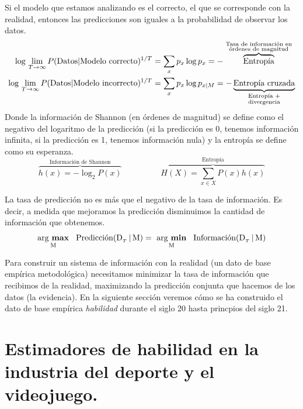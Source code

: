 \documentclass[a4paper,11pt]{book}
\newcommand\hfrac[2]{\genfrac{}{}{0pt}{}{#1}{#2}} %
\theoremstyle{definition}
\begin{document}
Si el modelo que estamos analizando es el correcto, el que se corresponde con la realidad, entonces las predicciones son iguales a la probabilidad de observar los datos.
%
\begin{align*}
\log \, \lim_{T \rightarrow \infty} P(\text{Datos}|\text{Modelo correcto})^{1/T} &= \sum_x p_x \log p_x = - \overbrace{\text{Entropía}}^{\hfrac{\text{\scriptsize Tasa de información en}}{\text{\scriptsize órdenes de magnitud}}} \\
\log \, \lim_{T \rightarrow \infty} P(\text{Datos}|\text{Modelo incorrecto})^{1/T} &= \sum_x p_x \log p_{x|M} = - \underbrace{\text{Entropía cruzada}}_{\hfrac{\text{\scriptsize Entropía +}}{\text{\scriptsize divergencia}}}
\end{align*}
%
Donde la información de Shannon (en órdenes de magnitud) se define como el negativo del logaritmo de la predicción (si la predicción es 0, tenemos información infinita, si la predicción es 1, tenemos información nula) y la entropía se define como su esperanza.
%
\begin{equation*}
\overbrace{h(x) = - \log_2 P(x)}^{\text{Información de Shannon}}  \hspace{2cm} \overbrace{H(X) = \sum_{x\in X} P(x) h(x)}^{\text{Entropía}}
\end{equation*}


La tasa de predicción no es más que el negativo de la tasa de información.
%
Es decir, a medida que mejoramos la predicción disminuimos la cantidad de información que obtenemos.
%
\begin{equation*}
\underset{\text{M}}{\text{arg \textbf{max}}}
\hspace{0.3cm}  \text{Predicción}(\text{D}_{_T} \, | \, \text{M}) = \ \underset{\text{M}}{\text{arg \textbf{min}}} \hspace{0.3cm} \text{Información} (\text{D}_{_T}\,|\,\text{M})
\end{equation*}


Para construir un sistema de información con la realidad (un dato de base empírica metodológica) necesitamos minimizar la tasa de información que recibimos de la realidad, maximizando la predicción conjunta que hacemos de los datos (la evidencia).
%
En la siguiente sección veremos cómo se ha construido el dato de base empírica \emph{habilidad} durante el siglo 20 hasta princpios del siglo 21.

\section{Estimadores de habilidad en la industria del deporte y el videojuego.} \label{sec:base_empirica_metodo}
\end{document}
